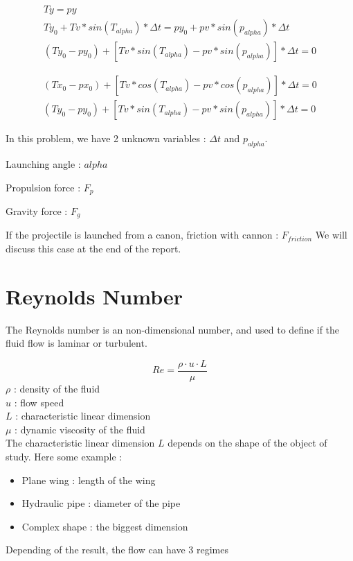 \documentclass[12pt,a4paper]{article}
\begin{document}
\begin{eqnarray}
	Ty = py \\
	Ty_0 + Tv * sin(T_{alpha}) * \Delta t = py_0 + pv * sin(p_{alpha}) * \Delta t\\
	(Ty_0 -py_0) + [Tv * sin(T_{alpha}) - pv * sin(p_{alpha})] * \Delta t = 0
\end{eqnarray}


\begin{eqnarray}
	(Tx_0 - px_0) + [Tv * cos(T_{alpha})-pv * cos(p_{alpha}) ] * \Delta t =  0 \\
	(Ty_0 -py_0) + [Tv * sin(T_{alpha}) - pv * sin(p_{alpha})] * \Delta t = 0
\end{eqnarray}

In this problem, we have 2 unknown variables : $\Delta t$ and $p_{alpha}$.



Launching angle : $alpha$

Propulsion force : $F_p$

Gravity force : $F_g$

If the projectile is launched from a canon, 
friction with cannon : $F_{friction}$
We will discuss this case at the end of the report. 

\section{Reynolds Number}
The Reynolds number is an non-dimensional number, and used to define if the fluid flow is laminar or turbulent. 

\begin{equation}
	Re = \frac{\rho \cdot u \cdot L}{\mu}
\end{equation}
$\rho$ : density of the fluid\\
$u$ : flow speed\\
$L$ : characteristic linear dimension\\
$\mu$ : dynamic viscosity of the fluid\\

The characteristic linear dimension $L$ depends on the shape of the object of study. Here some example : 
\begin{itemize}
	\item Plane wing : length of the wing
	\item Hydraulic pipe : diameter of the pipe
	\item Complex shape : the biggest dimension
\end{itemize}
Depending of the result, the flow can have 3 regimes
\end{document}
